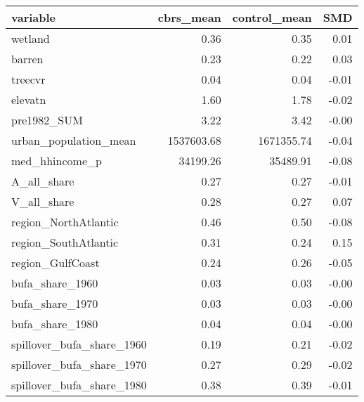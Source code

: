 \begin{table}[ht]
\centering
\begin{tabular}{lrrr}
  \hline
variable & cbrs\_mean & control\_mean & SMD \\ 
  \hline
wetland & 0.36 & 0.35 & 0.01 \\ 
  barren & 0.23 & 0.22 & 0.03 \\ 
  treecvr & 0.04 & 0.04 & -0.01 \\ 
  elevatn & 1.60 & 1.78 & -0.02 \\ 
  pre1982\_SUM & 3.22 & 3.42 & -0.00 \\ 
  urban\_population\_mean & 1537603.68 & 1671355.74 & -0.04 \\ 
  med\_hhincome\_p & 34199.26 & 35489.91 & -0.08 \\ 
  A\_all\_share & 0.27 & 0.27 & -0.01 \\ 
  V\_all\_share & 0.28 & 0.27 & 0.07 \\ 
  region\_NorthAtlantic & 0.46 & 0.50 & -0.08 \\ 
  region\_SouthAtlantic & 0.31 & 0.24 & 0.15 \\ 
  region\_GulfCoast & 0.24 & 0.26 & -0.05 \\ 
  bufa\_share\_1960 & 0.03 & 0.03 & -0.00 \\ 
  bufa\_share\_1970 & 0.03 & 0.03 & -0.00 \\ 
  bufa\_share\_1980 & 0.04 & 0.04 & -0.00 \\ 
  spillover\_bufa\_share\_1960 & 0.19 & 0.21 & -0.02 \\ 
  spillover\_bufa\_share\_1970 & 0.27 & 0.29 & -0.02 \\ 
  spillover\_bufa\_share\_1980 & 0.38 & 0.39 & -0.01 \\ 
   \hline
\end{tabular}
\end{table}
